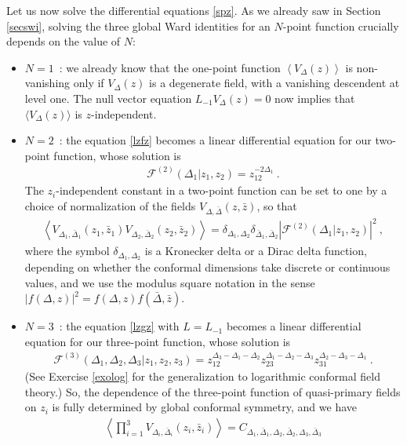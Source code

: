 \documentclass[12pt, a4paper, notitlepage, twoside]{report}
\numberwithin{equation}{section}
\theoremstyle{break}
\begin{document}
Let us now solve the differential equations \eqref{spz}.
As we already saw in Section \ref{secswi}, solving the three global Ward identities for an $N$-point function crucially depends on the value of $N$:
\begin{itemize}
 \item $\boxed{N=1}$\ : we already know that the one-point function $\left\langle V_\Delta(z)\right\rangle$ is non-vanishing only if $V_\Delta(z)$ is a degenerate field, with a vanishing descendent at level one.
The null vector equation $L_{-1}V_\Delta(z)=0$ now implies that $\langle V_\Delta(z)\rangle$ is $z$-independent.
\item $\boxed{N=2}$\ : the equation \eqref{lzfz} becomes a linear differential equation for our two-point function, whose solution is 
\begin{align}
 \boxed{\mathcal{F}^{(2)}(\Delta_1|z_1,z_2) = z_{12}^{-2\Delta_1}}\ .
\label{fzz}
\end{align}
The $z_i$-independent constant in a two-point function can be set to one by a choice of normalization of the fields $V_{\Delta,\bar{\Delta}}(z,\bar{z})$, so that 
\begin{align}
 \left\langle V_{\Delta_1,\bar{\Delta}_1}(z_1,\bar{z}_1) V_{\Delta_2,\bar{\Delta}_2}(z_2,\bar{z}_2)\right\rangle = \delta_{\Delta_1,\Delta_2}\delta_{\bar{\Delta}_1,\bar{\Delta}_2} \left|\mathcal{F}^{(2)}(\Delta_1|z_1,z_2)\right|^2\ ,
\end{align}
where the symbol $\delta_{\Delta_1,\Delta_2}$ is a Kronecker delta or a Dirac delta function, depending on whether the conformal dimensions take discrete or continuous values, and we use the modulus square notation in the sense $|f(\Delta,z)|^2 = f(\Delta,z)f(\bar{\Delta},\bar{z})$.
\item $\boxed{N=3}$\ : the equation \eqref{lzgz} with $L=L_{-1}$ becomes a linear differential equation for our three-point function, whose solution is 
\begin{align}
 \boxed{\mathcal{F}^{(3)}(\Delta_1,\Delta_2,\Delta_3|z_1,z_2,z_3) = z_{12}^{\Delta_3-\Delta_1-\Delta_2} z_{23}^{\Delta_1-\Delta_2-\Delta_3} z_{31}^{\Delta_2-\Delta_3-\Delta_1}}\ .
\label{fzzz}
\end{align}
(See Exercise \ref{exolog} for the generalization to logarithmic conformal field theory.) 
So, the dependence of the three-point function of quasi-primary fields on $z_i$ is fully determined by global conformal symmetry, and we have 
\begin{align}
 \left\langle \prod_{i=1}^3 V_{\Delta_i,\bar{\Delta}_i}(z_i,\bar{z}_i) \right\rangle = C_{\Delta_1,\bar{\Delta}_1,\Delta_2,\bar{\Delta}_2,\Delta_3,\bar{\Delta}_3}

\end{align}
\end{itemize}
\end{document}
